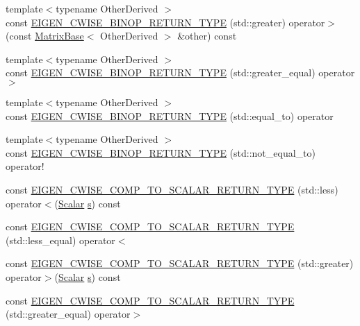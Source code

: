 \begin{DoxyCompactItemize}
\item 
{\footnotesize template$<$typename Other\-Derived $>$ }\\const \hyperlink{class_cwise_a65962da0f92c38afa9cfa4e969fea75e}{E\-I\-G\-E\-N\-\_\-\-C\-W\-I\-S\-E\-\_\-\-B\-I\-N\-O\-P\-\_\-\-R\-E\-T\-U\-R\-N\-\_\-\-T\-Y\-P\-E} (std\-::greater) operator$>$(const \hyperlink{class_matrix_base}{Matrix\-Base}$<$ Other\-Derived $>$ \&other) const 
\item 
{\footnotesize template$<$typename Other\-Derived $>$ }\\const \hyperlink{class_cwise_afa58f88289f663bc1f2191be664c0c2a}{E\-I\-G\-E\-N\-\_\-\-C\-W\-I\-S\-E\-\_\-\-B\-I\-N\-O\-P\-\_\-\-R\-E\-T\-U\-R\-N\-\_\-\-T\-Y\-P\-E} (std\-::greater\-\_\-equal) operator$>$
\item 
{\footnotesize template$<$typename Other\-Derived $>$ }\\const \hyperlink{class_cwise_a16e2bab5eb1424f96a5dec93b4e46fa8}{E\-I\-G\-E\-N\-\_\-\-C\-W\-I\-S\-E\-\_\-\-B\-I\-N\-O\-P\-\_\-\-R\-E\-T\-U\-R\-N\-\_\-\-T\-Y\-P\-E} (std\-::equal\-\_\-to) operator
\item 
{\footnotesize template$<$typename Other\-Derived $>$ }\\const \hyperlink{class_cwise_ac831b519e46433f450c1a18a8e80a8a0}{E\-I\-G\-E\-N\-\_\-\-C\-W\-I\-S\-E\-\_\-\-B\-I\-N\-O\-P\-\_\-\-R\-E\-T\-U\-R\-N\-\_\-\-T\-Y\-P\-E} (std\-::not\-\_\-equal\-\_\-to) operator!
\item 
const \hyperlink{class_cwise_a41016d8492095b9582ae4dd42363e6a7}{E\-I\-G\-E\-N\-\_\-\-C\-W\-I\-S\-E\-\_\-\-C\-O\-M\-P\-\_\-\-T\-O\-\_\-\-S\-C\-A\-L\-A\-R\-\_\-\-R\-E\-T\-U\-R\-N\-\_\-\-T\-Y\-P\-E} (std\-::less) operator$<$(\hyperlink{class_cwise_aaa88a1b7a680bc160011b24e948bcaaf}{Scalar} \hyperlink{glext_8h_ad585a1393cfa368fa9dc3d8ebff640d5}{s}) const 
\item 
const \hyperlink{class_cwise_ae5e2424a51ec3b1f11aec4605dc95ef5}{E\-I\-G\-E\-N\-\_\-\-C\-W\-I\-S\-E\-\_\-\-C\-O\-M\-P\-\_\-\-T\-O\-\_\-\-S\-C\-A\-L\-A\-R\-\_\-\-R\-E\-T\-U\-R\-N\-\_\-\-T\-Y\-P\-E} (std\-::less\-\_\-equal) operator$<$
\item 
const \hyperlink{class_cwise_ac64c0e580c11ed813464fcd907baf723}{E\-I\-G\-E\-N\-\_\-\-C\-W\-I\-S\-E\-\_\-\-C\-O\-M\-P\-\_\-\-T\-O\-\_\-\-S\-C\-A\-L\-A\-R\-\_\-\-R\-E\-T\-U\-R\-N\-\_\-\-T\-Y\-P\-E} (std\-::greater) operator$>$(\hyperlink{class_cwise_aaa88a1b7a680bc160011b24e948bcaaf}{Scalar} \hyperlink{glext_8h_ad585a1393cfa368fa9dc3d8ebff640d5}{s}) const 
\item 
const \hyperlink{class_cwise_a87dba73f07d4727647f38f22020baa63}{E\-I\-G\-E\-N\-\_\-\-C\-W\-I\-S\-E\-\_\-\-C\-O\-M\-P\-\_\-\-T\-O\-\_\-\-S\-C\-A\-L\-A\-R\-\_\-\-R\-E\-T\-U\-R\-N\-\_\-\-T\-Y\-P\-E} (std\-::greater\-\_\-equal) operator$>$

\end{DoxyCompactItemize}
